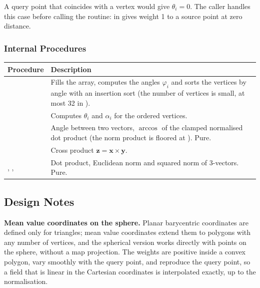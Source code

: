 A query point that coincides with a vertex would give $\theta_i = 0$. The
caller handles this case before calling the routine:
 in  gives weight 1 to a source
point at zero distance.

\subsubsection{Internal Procedures}

\begin{longtable}{L{4.5cm} L{9.5cm}}
  \toprule
  \textbf{Procedure} & \textbf{Description} \\
  \midrule
  \endhead
  \bottomrule
  \endfoot
   &
    Fills the  array, computes the angles $\varphi_i$ and
    sorts the vertices by angle with an insertion sort (the number of
    vertices is small, at most 32 in ). \\
   &
    Computes $\theta_i$ and $\alpha_i$ for the ordered vertices. \\
   &
    Angle between two vectors, $\arccos$ of the clamped normalised dot
    product (the norm product is floored at ). Pure. \\
   &
    Cross product $\mathbf{z} = \mathbf{x}\times\mathbf{y}$. \\
  , ,  &
    Dot product, Euclidean norm and squared norm of 3-vectors. Pure. \\
\end{longtable}

\subsection{Design Notes}
\label{subsec:spbar_design}

\textbf{Mean value coordinates on the sphere.} Planar barycentric
coordinates are defined only for triangles; mean value coordinates extend
them to polygons with any number of vertices, and the spherical version
works directly with points on the sphere, without a map projection. The
weights are positive inside a convex polygon, vary smoothly with the query
point, and reproduce the query point, so a field that is linear in the
Cartesian coordinates is interpolated exactly, up to the normalisation.

